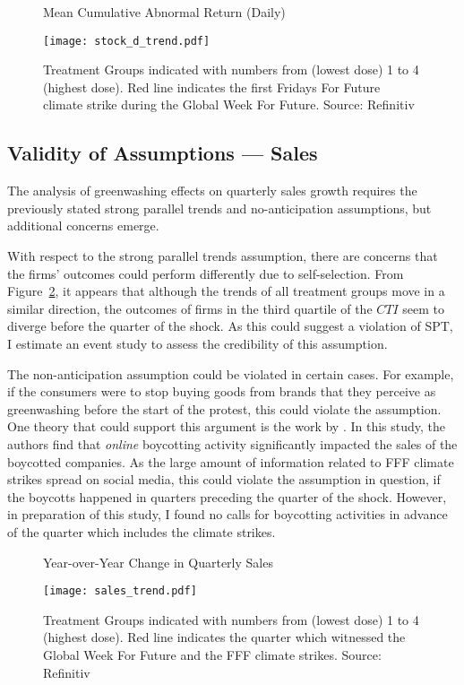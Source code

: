 \documentclass[12pt]{article}
\begin{document}
\begin{figure}[t]
    \caption{Mean Cumulative Abnormal Return (Daily)}\label{fig:stock_trend}
    \centering
    \texttt{[image: stock\_d\_trend.pdf]}
    \captionsetup{font=footnotesize}
    \caption*{Treatment Groups indicated with numbers from (lowest dose) 1 to 4 (highest dose). Red line indicates the first Fridays For Future climate strike during the Global Week For Future. Source: Refinitiv}
\end{figure}

\subsection{Validity of Assumptions --- Sales}

The analysis of greenwashing effects on quarterly sales growth requires the previously stated strong parallel trends and no-anticipation assumptions, but additional concerns emerge.

With respect to the strong parallel trends assumption, there are concerns that the firms' outcomes could perform differently due to self-selection. From Figure~\ref{fig:sales_trend}, it appears that although the trends of all treatment groups move in a similar direction, the outcomes of firms in the third quartile of the $CTI$ seem to diverge before the quarter of the shock. As this could suggest a violation of SPT, I estimate an event study to assess the credibility of this assumption.

The non-anticipation assumption could be violated in certain cases. For example, if the consumers were to stop buying goods from brands that they perceive as greenwashing before the start of the protest, this could violate the assumption. One theory that could support this argument is the work by \textcite{liaukonyteFrontiersSpillingBeans2023}. In this study, the authors find that \textit{online} boycotting activity significantly impacted the sales of the boycotted companies. As the large amount of information related to FFF climate strikes spread on social media, this could violate the assumption in question, if the boycotts happened in quarters preceding the quarter of the shock. However, in preparation of this study, I found no calls for boycotting activities in advance of the quarter which includes the climate strikes. 


\begin{figure}[t]
    \caption{Year-over-Year Change in Quarterly Sales}\label{fig:sales_trend}
    \centering
    \texttt{[image: sales\_trend.pdf]}
    \captionsetup{font=footnotesize}
    \caption*{Treatment Groups indicated with numbers from (lowest dose) 1 to 4 (highest dose). Red line indicates the quarter which witnessed the Global Week For Future and the FFF climate strikes. Source: Refinitiv}
\end{figure}
\end{document}
